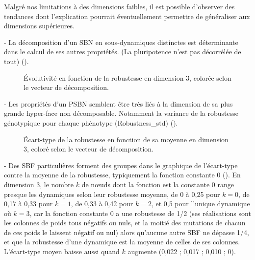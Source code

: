 \documentclass[12pt, a4paper]{article}
\begin{document}
Malgré nos limitations à des dimensions faibles, il est possible d'observer des tendances dont l'explication pourrait éventuellement permettre de généraliser aux dimensions supérieures.

- La décomposition d'un SBN en sous-dynamiques distinctes est déterminante dans le calcul de ses autres propriétés. (La pluripotence n'est pas décorrélée de tout) ().

\begin{figure}[H]
    \centering
    \caption{Évolutivité en fonction de la robustesse en dimension 3, colorée selon le vecteur de décomposition.}
    \label{fig:ol2a}
\end{figure}

- Les propriétés d'un PSBN semblent être très liés à la dimension de sa plus grande hyper-face non décomposable. Notamment la variance de la robustesse génotypique pour chaque phénotype (Robustness\_std) ().

\begin{figure}[H]
    \centering
    \caption{Écart-type de la robustesse en fonction de sa moyenne en dimension 3, coloré selon le vecteur de décomposition.}
    \label{fig:ol2b}
\end{figure}

- Des SBF particulières forment des groupes dans le graphique de l'écart-type contre la moyenne de la robustesse, typiquement la fonction constante 0 (). En dimension 3, le nombre $k$ de nœuds dont la fonction est la constante 0 range presque les dynamiques selon leur robustesse moyenne, de 0 à 0,25 pour $k = 0$, de 0,17 à 0,33 pour $k = 1$, de 0,33 à 0,42 pour $k = 2$, et 0,5 pour l'unique dynamique où $k = 3$, car la fonction constante 0 a une robustesse de 1/2 (ses réalisations sont les colonnes de poids tous négatifs ou nuls, et la moitié des mutations de chacun de ces poids le laissent négatif ou nul) alors qu'aucune autre SBF ne dépasse 1/4, et que la robustesse d'une dynamique est la moyenne de celles de ses colonnes. L'écart-type moyen baisse aussi quand $k$ augmente (0,022 ; 0,017 ; 0,010 ; 0).
\end{document}
